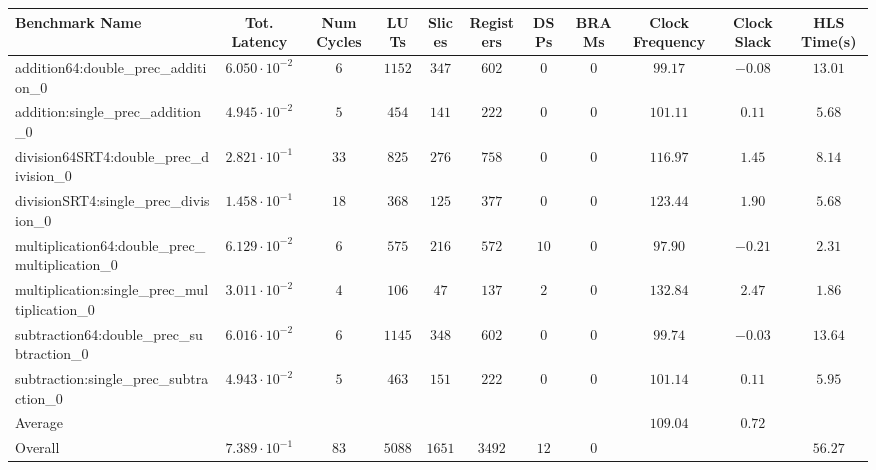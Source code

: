 \begin{tabular}{|l|c|c|c|c|c|c|c|c|c|c|}
\hline
Benchmark Name                                   & Tot. Latency            & Num Cycles & LUTs     & Slices   & Registers & DSPs   & BRAMs & Clock Frequency & Clock Slack & HLS Time(s) \\
\hline
addition64:double\_prec\_addition\_0             & $ 6.050 \cdot 10^{-2} $ & $ 6      $ & $ 1152 $ & $ 347  $ & $ 602   $ & $ 0  $ & $ 0 $ & $ 99.17       $ & $ -0.08   $ & $ 13.01   $ \\
addition:single\_prec\_addition\_0               & $ 4.945 \cdot 10^{-2} $ & $ 5      $ & $ 454  $ & $ 141  $ & $ 222   $ & $ 0  $ & $ 0 $ & $ 101.11      $ & $ 0.11    $ & $ 5.68    $ \\
division64SRT4:double\_prec\_division\_0         & $ 2.821 \cdot 10^{-1} $ & $ 33     $ & $ 825  $ & $ 276  $ & $ 758   $ & $ 0  $ & $ 0 $ & $ 116.97      $ & $ 1.45    $ & $ 8.14    $ \\
divisionSRT4:single\_prec\_division\_0           & $ 1.458 \cdot 10^{-1} $ & $ 18     $ & $ 368  $ & $ 125  $ & $ 377   $ & $ 0  $ & $ 0 $ & $ 123.44      $ & $ 1.90    $ & $ 5.68    $ \\
multiplication64:double\_prec\_multiplication\_0 & $ 6.129 \cdot 10^{-2} $ & $ 6      $ & $ 575  $ & $ 216  $ & $ 572   $ & $ 10 $ & $ 0 $ & $ 97.90       $ & $ -0.21   $ & $ 2.31    $ \\
multiplication:single\_prec\_multiplication\_0   & $ 3.011 \cdot 10^{-2} $ & $ 4      $ & $ 106  $ & $ 47   $ & $ 137   $ & $ 2  $ & $ 0 $ & $ 132.84      $ & $ 2.47    $ & $ 1.86    $ \\
subtraction64:double\_prec\_subtraction\_0       & $ 6.016 \cdot 10^{-2} $ & $ 6      $ & $ 1145 $ & $ 348  $ & $ 602   $ & $ 0  $ & $ 0 $ & $ 99.74       $ & $ -0.03   $ & $ 13.64   $ \\
subtraction:single\_prec\_subtraction\_0         & $ 4.943 \cdot 10^{-2} $ & $ 5      $ & $ 463  $ & $ 151  $ & $ 222   $ & $ 0  $ & $ 0 $ & $ 101.14      $ & $ 0.11    $ & $ 5.95    $ \\
\hline
Average                                          & $                     $ & $        $ & $      $ & $      $ & $       $ & $    $ & $   $ & $ 109.04      $ & $ 0.72    $ & $         $ \\
\hline
Overall                                          & $ 7.389 \cdot 10^{-1} $ & $ 83     $ & $ 5088 $ & $ 1651 $ & $ 3492  $ & $ 12 $ & $ 0 $ & $             $ & $         $ & $ 56.27   $ \\
\hline
\end{tabular}
